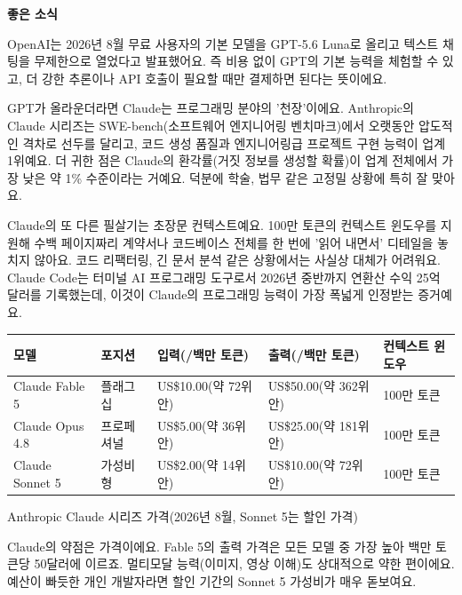 \textbf{좋은 소식}\par

OpenAI는 2026년 8월 무료 사용자의 기본 모델을 GPT-5.6 Luna로 올리고 텍스트 채팅을 무제한으로 열었다고 발표했어요. 즉 비용 없이 GPT의 기본 능력을 체험할 수 있고, 더 강한 추론이나 API 호출이 필요할 때만 결제하면 된다는 뜻이에요.


GPT가 올라운더라면 Claude는 프로그래밍 분야의 '천장'이에요. Anthropic의 Claude 시리즈는 SWE-bench(소프트웨어 엔지니어링 벤치마크)에서 오랫동안 압도적인 격차로 선두를 달리고, 코드 생성 품질과 엔지니어링급 프로젝트 구현 능력이 업계 1위예요. 더 귀한 점은 Claude의 환각률(거짓 정보를 생성할 확률)이 업계 전체에서 가장 낮은 약 1\% 수준이라는 거예요. 덕분에 학술, 법무 같은 고정밀 상황에 특히 잘 맞아요.

Claude의 또 다른 필살기는 초장문 컨텍스트예요. 100만 토큰의 컨텍스트 윈도우를 지원해 수백 페이지짜리 계약서나 코드베이스 전체를 한 번에 '읽어 내면서' 디테일을 놓치지 않아요. 코드 리팩터링, 긴 문서 분석 같은 상황에서는 사실상 대체가 어려워요. Claude Code는 터미널 AI 프로그래밍 도구로서 2026년 중반까지 연환산 수익 25억 달러를 기록했는데, 이것이 Claude의 프로그래밍 능력이 가장 폭넓게 인정받는 증거예요.

\begin{center}
\begin{tabularx}{\linewidth}{|X|X|X|X|X|}
\hline
\textbf{모델} & \textbf{포지션} & \textbf{입력(/백만 토큰)} & \textbf{출력(/백만 토큰)} & \textbf{컨텍스트 윈도우} \tabularnewline
\hline
Claude Fable 5 & 플래그십 & US\$10.00(약 72위안) & US\$50.00(약 362위안) & 100만 토큰 \tabularnewline
Claude Opus 4.8 & 프로페셔널 & US\$5.00(약 36위안) & US\$25.00(약 181위안) & 100만 토큰 \tabularnewline
Claude Sonnet 5 & 가성비형 & US\$2.00(약 14위안) & US\$10.00(약 72위안) & 100만 토큰 \tabularnewline
\hline
\end{tabularx}
\end{center}

\begin{center}\small\color{gray}Anthropic Claude 시리즈 가격(2026년 8월, Sonnet 5는 할인 가격)\end{center}

Claude의 약점은 가격이에요. Fable 5의 출력 가격은 모든 모델 중 가장 높아 백만 토큰당 50달러에 이르죠. 멀티모달 능력(이미지, 영상 이해)도 상대적으로 약한 편이에요. 예산이 빠듯한 개인 개발자라면 할인 기간의 Sonnet 5 가성비가 매우 돋보여요.

